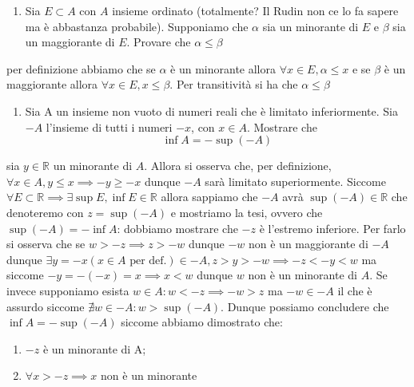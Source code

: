 \documentclass{report}
\begin{document}
\begin{enumerate}[resume, label=\protect\circled{\arabic*}]
	\item Sia $E \subset A$ con $A$ insieme ordinato (totalmente? Il Rudin non ce lo fa sapere ma è abbastanza probabile). Supponiamo che $\alpha$ sia un minorante di $E$ e $\beta$ sia un maggiorante di $E$. Provare che $\alpha \leq \beta$
\end{enumerate}
\begin{mysolution}
	per definizione abbiamo che se $\alpha$ è un minorante allora $\forall x \in E, \alpha \leq x$ e se $\beta$ è un maggiorante allora $\forall x \in E, x \leq \beta$. Per transitività si ha che $\alpha \leq \beta$
\end{mysolution}
\begin{enumerate}[resume, label=\protect\circled{\arabic*}]
	\item Sia A un insieme non vuoto di numeri reali che è limitato inferiormente. Sia $-A$ l'insieme di tutti i numeri $-x$, con $x \in A$. Mostrare che
	$$
		\inf{A} = - \sup{(-A)}
	$$
\end{enumerate}
\begin{mysolution}
	sia $y \in \mathbb{R}$ un minorante di $A$. Allora si osserva che, per definizione, $\forall x \in A, y \leq x \implies -y \geq -x$ dunque $-A$ sarà limitato superiormente. Siccome $\forall E \subset \mathbb{R} \implies \exists \sup{E}, \inf{E} \in \mathbb{R}$ allora sappiamo che $-A$ avrà $\sup{(-A)} \in \mathbb{R}$ che denoteremo con $z = \sup{(-A)}$ e mostriamo la tesi, ovvero che $\sup{(-A)} = -\inf{A}$: dobbiamo mostrare che $-z$ è l'estremo inferiore. Per farlo si osserva che se $w > -z \implies z > -w$ dunque $-w$ non è un maggiorante di $-A$ dunque $\exists y=-x(x \in A \text{ per def.}) \in -A, z > y > -w \implies -z < -y < w$ ma siccome $-y=-(-x) = x \implies x < w$ dunque $w$ non è un minorante di $A$. Se invece supponiamo esista $w \in A : w < -z \implies -w > z$ ma $-w \in -A$ il che è assurdo siccome $\nexists w \in -A: w > \sup{(-A)}$. Dunque possiamo concludere che $\inf{A} = -\sup{(-A)}$ siccome abbiamo dimostrato che:
\begin{enumerate}[label=\protect\circled{\arabic*}]
	\item $-z$ è un minorante di A;
	\item $\forall x > -z \implies x $ non è un minorante 
\end{enumerate}
\end{mysolution}
\end{document}
